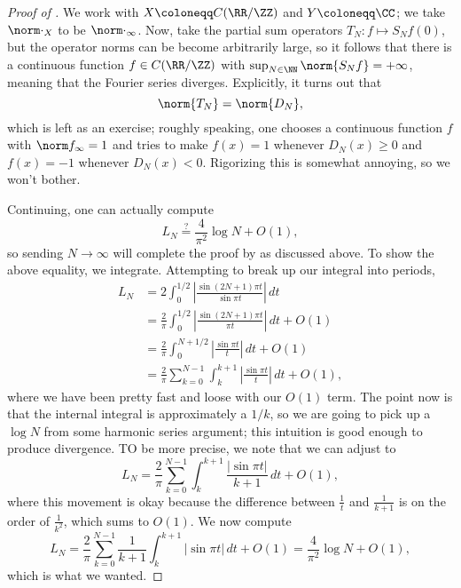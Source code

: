 \documentclass[../notes.tex]{subfiles}
\begin{document}
\begin{proof}[Proof of ]
	We work with $X\coloneqq C(\RR/\ZZ)$ and $Y\coloneqq\CC$; we take $\norm\cdot_X$ to be $\norm\cdot_\infty$. Now, take the partial sum operators $T_N\colon f\mapsto S_Nf(0)$, but the operator norms can be become arbitrarily large, so it follows that there is a continuous function $f\in C(\RR/\ZZ)$ with $\sup_{N\in\NN}\norm{S_Nf}=+\infty$, meaning that the Fourier series diverges. Explicitly, it turns out that
	\[\norm{T_N}=\norm{D_N},\]
	which is left as an exercise; roughly speaking, one chooses a continuous function $f$ with $\norm f_\infty=1$ and tries to make $f(x)=1$ whenever $D_N(x)\ge0$ and $f(x)=-1$ whenever $D_N(x)<0$. Rigorizing this is somewhat annoying, so we won't bother.

	Continuing, one can actually compute
	\[L_N\stackrel?=\frac4{\pi^2}\log N+O(1),\]
	so sending $N\to\infty$ will complete the proof by  as discussed above. To show the above equality, we integrate. Attempting to break up our integral into periods,
	\begin{align*}
		L_N &= 2\int_0^{1/2}\left|\frac{\sin(2N+1)\pi t}{\sin\pi t}\right|\,dt \\
		&= \frac2\pi\int_0^{1/2}\left|\frac{\sin(2N+1)\pi t}{\pi t}\right|\,dt+O(1) \\
		&= \frac2\pi\int_0^{N+1/2}\left|\frac{\sin\pi t}t\right|\,dt+O(1) \\
		&= \frac2\pi\sum_{k=0}^{N-1}\int_k^{k+1}\left|\frac{\sin\pi t}t\right|\,dt+O(1),
	\end{align*}
	where we have been pretty fast and loose with our $O(1)$ term. The point now is that the internal integral is approximately a $1/k$, so we are going to pick up a $\log N$ from some harmonic series argument; this intuition is good enough to produce divergence. TO be more precise, we note that we can adjust to
	\[L_N=\frac2\pi\sum_{k=0}^{N-1}\int_k^{k+1}\frac{\left|\sin\pi t\right|}{k+1}\,dt+O(1),\]
	where this movement is okay because the difference between $\frac1t$ and $\frac1{k+1}$ is on the order of $\frac1{k^2}$, which sums to $O(1)$. We now compute
	\[L_N=\frac2\pi\sum_{k=0}^{N-1}\frac1{k+1}\int_k^{k+1}\left|\sin\pi t\right|\,dt+O(1)=\frac4{\pi^2}\log N+O(1),\]
	which is what we wanted.
\end{proof}
\end{document}
